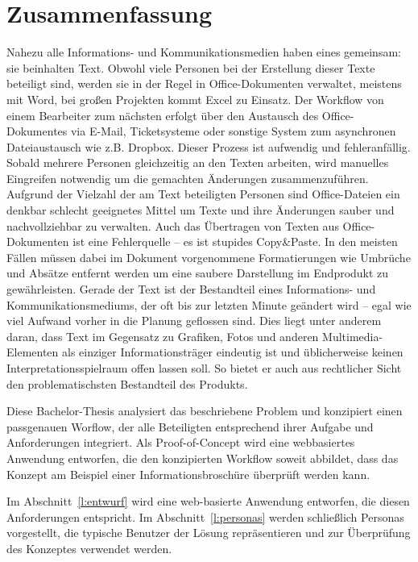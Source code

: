 \section*{Zusammenfassung}

\TODO

Nahezu alle Informations- und Kommunikationsmedien haben eines gemeinsam: sie beinhalten Text. Obwohl viele Personen bei der Erstellung dieser Texte beteiligt sind, werden sie in der Regel in Office-Dokumenten verwaltet, meistens mit Word, bei großen Projekten kommt Excel zu Einsatz. Der Workflow von einem Bearbeiter zum nächsten erfolgt über den Austausch des Office-Dokumentes via E-Mail, Ticketsysteme oder sonstige System zum asynchronen Dateiaustausch wie z.B. Dropbox. Dieser Prozess ist aufwendig und fehleranfällig. Sobald mehrere Personen gleichzeitig an den Texten arbeiten, wird manuelles Eingreifen notwendig um die gemachten Änderungen zusammenzuführen. Aufgrund der Vielzahl der am Text beteiligten Personen sind Office-Dateien ein denkbar schlecht geeignetes Mittel um Texte und ihre Änderungen sauber und nachvollziehbar zu verwalten. Auch das Übertragen von Texten aus Office-Dokumenten ist eine Fehlerquelle – es ist stupides Copy\&\-Paste. In den meisten Fällen müssen dabei im Dokument vorgenommene Formatierungen wie Umbrüche und Absätze entfernt werden um eine saubere Darstellung im Endprodukt zu gewährleisten. Gerade der Text ist der Bestandteil eines Informations- und Kommunikationsmediums, der oft bis zur letzten Minute geändert wird – egal wie viel Aufwand vorher in die Planung geflossen sind. Dies liegt unter anderem daran, dass Text im Gegensatz zu Grafiken, Fotos und anderen Multimedia-Elementen als einziger Informationsträger eindeutig ist und üblicherweise keinen Interpretationsspielraum offen lassen soll. So bietet er auch aus rechtlicher Sicht den problematischsten Bestandteil des Produkts.

Diese Bachelor-Thesis analysiert das beschriebene Problem und konzipiert einen passgenauen Worflow, der alle Beteiligten entsprechend ihrer Aufgabe und Anforderungen integriert. Als Proof-of-Concept wird eine webbasiertes Anwendung entworfen, die den konzipierten Workflow soweit abbildet, dass das Konzept am Beispiel einer Informationsbroschüre überprüft werden kann. 

Im Abschnitt~\ref{l:entwurf} wird eine web-basierte Anwendung entworfen, die diesen Anforderungen entspricht. Im Abschnitt~\ref{l:personas} werden schließlich Personas vorgestellt, die typische Benutzer der Lösung repräsentieren und zur Überprüfung des Konzeptes verwendet werden.
